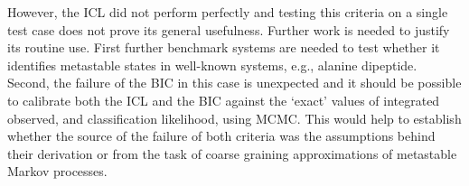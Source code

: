 However, the ICL did not perform perfectly and testing this criteria on a single test case does not prove its general usefulness. Further work is needed to justify its routine use. First further benchmark systems are needed to test whether it identifies  metastable states in well-known systems, e.g., alanine dipeptide. Second, the failure of the BIC in this case is unexpected and it should be possible to calibrate both the ICL and the BIC against the `exact' values of integrated observed, and classification likelihood, using MCMC. This would help to establish whether the source of the failure of both criteria was the assumptions behind their derivation or from the task of coarse graining approximations of metastable Markov processes. 
